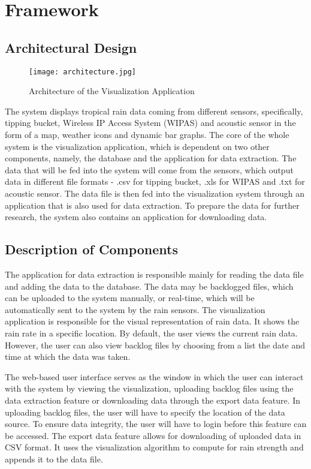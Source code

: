\chapter{Framework}
\section{Architectural Design}

\begin{figure}
    \centering
        \texttt{[image: architecture.jpg]}
    \caption{Architecture of the Visualization Application}
    \label{fig:architecture}
\end{figure}

\bigskip
The system displays tropical rain data coming from different sensors, specifically, tipping bucket, Wireless IP Access System (WIPAS) and acoustic sensor in the form of a map, weather icons and dynamic bar graphs. The core of the whole system is the visualization application, which is dependent on two other components, namely, the database and the application for data extraction. The data that will be fed into the system will come from the sensors, which output data in different file formats - .csv for tipping bucket, .xls for WIPAS and .txt for acoustic sensor. The data file is then fed into the visualization system through an application that is also used for data extraction. To prepare the data for further research, the system also contains an application for downloading data. 

\section{Description of Components}

The application for data extraction is responsible mainly for reading the data file and adding the data to the database. The data may be backlogged files, which can be uploaded to the system manually, or real-time, which will be automatically sent to the system by the rain sensors. The visualization application is responsible for the visual representation of rain data. It shows the rain rate in a specific location. By default, the user views the current rain data. However, the user can also view backlog files by choosing from a list the date and time at which the data was taken. 

\bigskip
The web-based user interface serves as the window in which the user can interact with the system by viewing the visualization,  uploading backlog files using the data extraction feature or downloading data through the export data feature. In uploading backlog files, the user will have to specify the location of the data source. To ensure data integrity, the user will have to login before this feature can be accessed. The export data feature allows for downloading of uploaded data in CSV format. It uses the visualization algorithm to compute for rain strength and appends it to the data file.  

